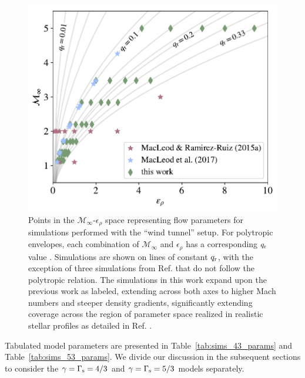 \begin{figure}[t]
  \includegraphics[width=\columnwidth]{figures/common_envelope/paramspace_v4.pdf}
 \caption{Points in the $\mathcal{M}_{\infty}$-$\epsilon_{\rho}$ space representing flow parameters for simulations performed with the ``wind tunnel'' setup. For polytropic envelopes, each combination of $\mathcal{M}_{\infty}$ and $\epsilon_{\rho}$ has a corresponding $q_{\rm r}$ value \cite{MacLeod:2017}. Simulations are shown on lines of constant $q_{\rm r}$, with the exception of three simulations from Ref. \cite{MacLeod_2015} that do not follow the polytropic relation. The simulations in this work expand upon the previous work as labeled, extending across both axes to higher Mach numbers and steeper density gradients, significantly extending coverage across the region of parameter space realized in realistic stellar profiles as detailed in Ref. \cite{Rosa:2020}.\label{fig:parameterspace}}
\vspace*{5mm}
\end{figure}

Tabulated model parameters are presented in Table~\ref{tab:sims_43_params} and Table~\ref{tab:sims_53_params}. We divide our discussion in the subsequent sections to consider the $\gamma = \Gamma_{\rm s}=4/3$ and $\gamma=\Gamma_{\rm s} = 5/3$ models separately.


